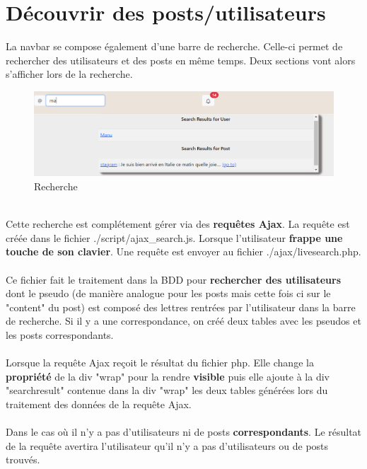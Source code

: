 \documentclass{article}
\begin{document}
\section{Découvrir des posts/utilisateurs}
La navbar se compose également d'une barre de recherche. Celle-ci permet de rechercher des utilisateurs et des posts en même temps. Deux sections vont alors s'afficher lors de la recherche.
\begin{figure}[h]\centering
\includegraphics[width=\textwidth]{recherche}
\caption{Recherche}
\end{figure}\\
Cette recherche est complétement gérer via des \textbf{requêtes Ajax}. La requête est créée dans le fichier ./script/ajax\_search.js. Lorsque l'utilisateur \textbf{frappe une touche de son clavier}. Une requête est envoyer au fichier ./ajax/livesearch.php.\\\\
 Ce fichier fait le traitement dans la BDD pour \textbf{rechercher des utilisateurs} dont le pseudo (de manière analogue pour les posts mais cette fois ci sur le "content" du post) est composé des lettres rentrées par l'utilisateur dans la barre de recherche. Si il y a une correspondance, on créé deux tables avec les pseudos et les posts correspondants.\\\\
Lorsque la requête Ajax reçoit le résultat du fichier php. Elle change la \textbf{propriété} de la div "wrap" pour la rendre \textbf{visible} puis elle ajoute à la div "searchresult" contenue dans la div "wrap" les deux tables générées lors du traitement des données de la requête Ajax.\\\\
Dans le cas où il n'y a pas d'utilisateurs ni de posts \textbf{correspondants}. Le résultat de la requête avertira l'utilisateur qu'il n'y a pas d'utilisateurs ou de posts trouvés.
\end{document}
